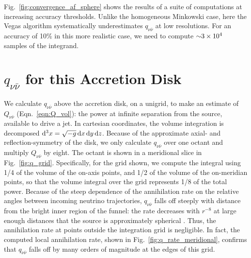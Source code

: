 Fig.~\ref{fig:convergence_af_sphere} shows the results of a suite of
computations at increasing accuracy thresholds.
Unlike the homogeneous Minkowski case, here the Vegas algorithm
systematically underestimates $q_{\nu\bar{\nu}}$ at low resolutions.
For an accuracy of 10\% in this more realistic case, we need to compute
$\mathord{\sim}3\times10^4$ samples of the integrand.

\section{$q_{\nu \bar{\nu}}$ for this Accretion Disk}
\label{sec:q_this_case}
We calculate $q_{\nu\bar{\nu}}$ above the accretion disk, on a unigrid, to make
an estimate of $Q_{\nu\bar{\nu}}$ (Eqn.~\ref{eqn:Q_vol}):
the power at infinite separation from the source, available to drive a jet.
In cartesian coordinates, the volume integration is decomposed
$\mathrm{d}^3 x=\sqrt{-g}\, \mathrm{d} x\,\mathrm{d} y\,\mathrm{d} z$.
Because of the approximate axial- and reflection-symmetry of the disk, we only
calculate $q_{\nu\bar{\nu}}$ over one octant and multiply $Q_{\nu\bar{\nu}}$ by
eight.
The octant is shown in a meridional slice in Fig.~\ref{fig:q_grid}.
Specifically, for the grid shown,
we compute the integral using 1/4 of the volume of the on-axis points,
and 1/2 of the volume of the on-meridian points,
so that the volume integral over the grid represents 1/8 of the total power.
Because of the steep dependence of the annihilation rate on the relative angles
between incoming neutrino trajectories, $q_{\nu\bar{\nu}}$ falls off steeply
with distance from the bright inner region of the funnel: the rate decreases with
$r^{-8}$ at large enough distances that the source is approximately spherical
\citep{seti2006-nunubar_and_spin}.
Thus, the annihilation rate at points outside the integration grid is negligible.
In fact, the computed local annihilation rate, shown in
Fig.~\ref{fig:q_rate_meridional},
confirms that $q_{\nu\bar{\nu}}$ falls off by many orders of magnitude at the
edges of this grid.

